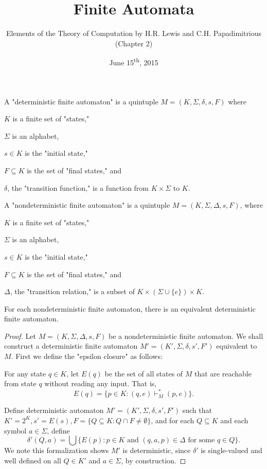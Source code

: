 \documentclass[a4paper,11pt]{article}
\title{Finite Automata}
\author{Elements of the Theory of Computation by H.R. Lewis and C.H. Papadimitrious (Chapter 2)}
\date{June 15\textsuperscript{th}, 2015}
\begin{document}
\maketitle
{}

\begin{outline}

    A "deterministic finite automaton" is a quintuple \(M=(K,\Sigma,\delta,s,F)\) where

    \quad\(K\) is a finite set of "states,"

    \quad\(\Sigma\) is an alphabet,

    \quad\(s \in K\) is the "initial state,"

    \quad\(F \subseteq K\) is the set of "final states," and

    \quad\(\delta\), the "transition function," is a function from \(K \times \Sigma\) to \(K\).

    A "nondeterministic finite automaton" is a quintuple \(M = (K, \Sigma, \Delta, s, F)\), where

    \quad\(K\) is a finite set of "states,"

    \quad\(\Sigma\) is an alphabet,

    \quad\(s \in K\) is the "initial state,"

    \quad\(F \subseteq K\) is the set of "final states," and

    \quad\(\Delta\), the "transition relation," is a subset of \(K\times(\Sigma\cup\{e\})\times K\).

    For each nondeterministic finite automaton, there is an equivalent deterministic finite automaton.

    \begin{proof}
      Let \(M=(K,\Sigma,\Delta,s,F)\) be a nondeterministic finite automaton. We shall construct a deterministic
      finite automaton \(M'=(K',\Sigma,\delta,s',F')\) equivalent to \(M\). First we define the "epsilon closure" as follows:

      For any state \(q \in K\), let \(E(q)\) be the set of all states of \(M\) that are reachable from state \(q\) without
      reading any input. That is, \[ E(q) = \{p\in K: (q,e) \vdash_M^* (p, e)\}\text{.} \]

      Define deterministic automaton \(M'=(K',\Sigma,\delta,s',F')\) such that \(K'=2^K, s'=E(s),F=\{Q \subseteq K: Q \cap F \neq \emptyset\}\),
      and for each \(Q \subseteq K\) and each symbol \(a \in \Sigma\), define
      \[ \delta'(Q, a) = \bigcup\{E(p): p \in K \text{ and } (q,a,p) \in \Delta \text{ for some } q \in Q\}\text{.} \]
      We note this formalization shows \(M'\) is deterministic, since \(\delta'\) is single-valued and well defined on all \(Q \in K'\)
      and \(a \in \Sigma\), by construction.


\end{proof}
\end{outline}
\end{document}

